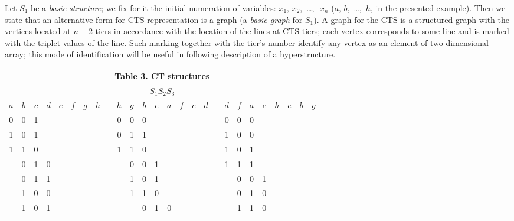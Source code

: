 \documentclass[12pt, a4paper]{article}
\begin{document}
Let $S_1$ be a {\it basic structure}; we fix for it the initial numeration of variables: $x_1, \,x_2$, \,\ldots ,\,~$x_n$
($a, \,b$, \,\ldots ,\ $h$, in the presented example). Then we state that an alternative form for CTS representation is a graph  (a {\it basic graph} for  $S_1$). A graph for the CTS is a structured graph with the vertices located at  $n-2$  tiers in accordance with the location of the lines at CTS tiers; each vertex corresponds to some line and is marked with the triplet values of the line. Such marking together with the tier's number identify any vertex as an element of two-dimensional array; this mode of identification will be useful in following description of a hyperstructure.


\bigskip

\begin{table}[tbp]
\begin{tabular}{|c|c|c|c|c|c|c|c|c|c|c|c|c|c|c|c|c|c|c|c|c|c|c|c|c|c|}
\multicolumn{26}{c}{\bf Table 3. CT structures}\\
\multicolumn{26}{c}{$S_1$\hspace{5cm}$S_2$\hspace{5cm}$S_3$}\\
\cline{1-8}
\cline{10-17}
\cline{19-26}
$a$&$b$&$c$&$d$&$e$&$f$&$g$&$h$&&$h$&$g$&$b$&$e$&$a$&$f$&$c$&$d$&&
$d$&$f$&$a$&$c$&$h$&$e$&$b$&$g$\\
\hhline{|=|=|=|=|=|=|=|=|~|=|=|=|=|=|=|=|=|~|=|=|=|=|=|=|=|=|}
0&0&1&&&&&& &0&0&0&&&&&& &0&0&0&&&&&\\
\cline{1-8}                                                        \cline{10-17}
\cline{19-26}
1&0&1&&&&&& &0&1&1&&&&&& &1&0&0&&&&&\\
\cline{1-8}                                                        \cline{10-17}
\cline{19-26}
1&1&0&&&&&& &1&1&0&&&&&& &1&0&1&&&&&\\
\cline{1-8}                                                        \cline{10-17}
\cline{19-26}
&0&1&0&&&&& &&0&0&1&&&&& &1&1&1&&&&&\\
\cline{1-8}                                                        \cline{10-17}
\cline{19-26}
&0&1&1&&&&& &&1&0&1&&&&& &&0&0&1&&&&\\
\cline{1-8}                                                        \cline{10-17}
\cline{19-26}
&1&0&0&&&&& &&1&1&0&&&&& &&0&1&0&&&&\\
\cline{1-8}                                                        \cline{10-17}
\cline{19-26}
&1&0&1&&&&& &&&0&1&0&&&& &&1&1&0&&&&\\

\end{tabular}
\end{table}
\end{document}
